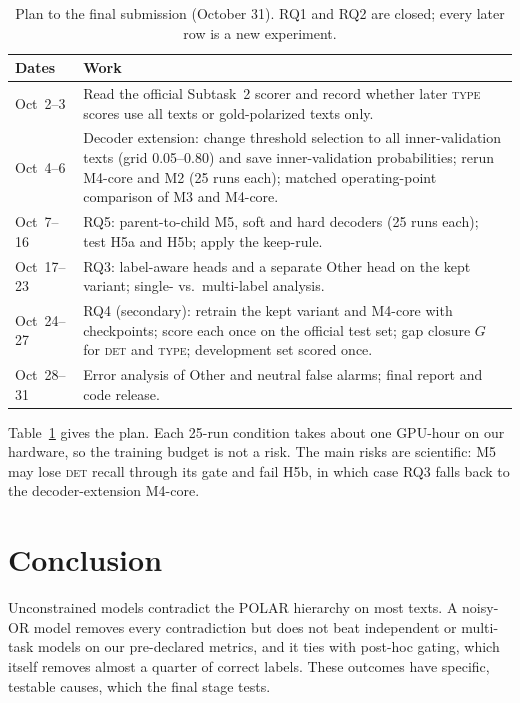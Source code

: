 \documentclass[11pt]{article}
\newcommand{\DET}{\textsc{det}}
\newcommand{\TYPE}{\textsc{type}}
\begin{document}
\begin{table}[t]
\centering\small
\setlength{\tabcolsep}{3pt}
\begin{tabular}{@{}p{1.45cm}p{5.55cm}@{}}
\toprule
Dates & Work \\
\midrule
Oct~2--3 & Read the official Subtask~2 scorer and record whether later \TYPE{} scores use all texts or gold-polarized texts only. \\
Oct~4--6 & Decoder extension: change threshold selection to all inner-validation texts (grid 0.05--0.80) and save inner-validation probabilities; rerun M4-core and M2 (25 runs each); matched operating-point comparison of M3 and M4-core. \\
Oct~7--16 & RQ5: parent-to-child M5, soft and hard decoders (25 runs each); test H5a and H5b; apply the keep-rule. \\
Oct~17--23 & RQ3: label-aware heads and a separate Other head on the kept variant; single- vs.\ multi-label analysis. \\
Oct~24--27 & RQ4 (secondary): retrain the kept variant and M4-core with checkpoints; score each once on the official test set; gap closure $G$ for \DET{} and \TYPE{}; development set scored once. \\
Oct~28--31 & Error analysis of Other and neutral false alarms; final report and code release. \\
\bottomrule
\end{tabular}
\caption{Plan to the final submission (October 31). RQ1 and RQ2 are closed;
every later row is a new experiment.}
\label{tab:timeline}
\end{table}

Table~\ref{tab:timeline} gives the plan. Each 25-run condition takes about
one GPU-hour on our hardware, so the training budget is not a risk. The main
risks are scientific: M5 may lose \DET{} recall through its gate and fail
H5b, in which case RQ3 falls back to the decoder-extension M4-core.

\section{Conclusion}

Unconstrained models contradict the POLAR hierarchy on most texts. A
noisy-OR model removes every contradiction but does not beat independent or
multi-task models on our pre-declared metrics, and it ties with post-hoc
gating, which itself removes almost a quarter of correct labels. These
outcomes have specific, testable causes, which the final stage tests.
\end{document}
